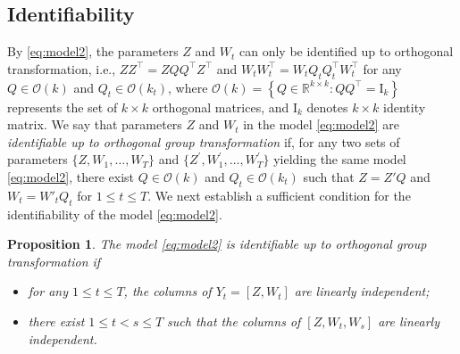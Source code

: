 \documentclass[12pt]{article}
\newtheorem{proposition}{Proposition}
\newcommand{\mytrans}{\top}
\begin{document}
\subsection{Identifiability}  \label{sec:ident}
By \eqref{eq:model2}, the parameters $Z$ and $W_t$ can only be identified up to orthogonal transformation, i.e.,  
$ZZ^{\top}=ZQQ^{\top} Z^{\top}$ and $W_t W_t^{\top}=W_tQ_tQ_t^{\top}  W_t^{\top}$ for any $Q\in \mathcal{O}(k)$ and $Q_t \in \mathcal{O}(k_t)$, where $\mathcal{O}(k)=\left\{Q \in \mathbb{R}^{k \times k}: Q Q^{\top}=\mathrm{I}_k\right\}$ represents the set of $k \times k$ orthogonal matrices, and $\mathrm{I}_k$ denotes $k\times k$ identity matrix.  
We say that parameters $Z$ and $W_t$ in the model \eqref{eq:model2} are \textit{identifiable up to orthogonal group transformation} if, for any two sets of parameters $\{Z, W_1,\ldots, W_T\}$ and $\{Z^\prime, W_1^\prime, \ldots, W_T^\prime\}$ yielding the same model \eqref{eq:model2}, 
there exist $Q\in \mathcal{O}(k)$ and $Q_t\in \mathcal{O}(k_t)$ 
such that $Z=Z' Q$ and $W_t=W'_t Q_t$ for $1\leqslant t \leqslant T$. 
We next establish a sufficient condition for the identifiability of the model \eqref{eq:model2}. 

\begin{proposition} \label{prop:identify}
The model \eqref{eq:model2} is identifiable up to orthogonal group transformation if 
\begin{itemize}\setlength{\itemsep}{0pt}
    \item[(i)] for any $1 \leqslant t  \leqslant T$, the columns of $Y_t=[Z, W_{t}]$
    are linearly independent;
    \item[(ii)] there exist $1 \leqslant t < s \leqslant T$ such that the columns of  $[ Z,  W_{t}, W_{s}]$ are linearly independent. 
\end{itemize}
\end{proposition} 

\end{document}
